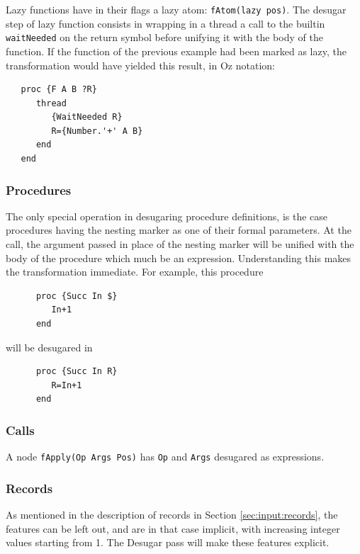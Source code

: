 \documentclass[a4paper]{memoir}
\begin{document}
Lazy functions have in their flags a lazy atom: \lstinline!fAtom(lazy pos)!.
The desugar step of lazy function consists in wrapping in a thread a call to the builtin \lstinline!waitNeeded! on the return symbol before unifying it with the body of the function. If the function of the previous example had been marked as lazy, the transformation would have yielded this result, in Oz notation:
\begin{lstlisting}
   proc {F A B ?R}
      thread 
         {WaitNeeded R}
         R={Number.'+' A B}
      end
   end
\end{lstlisting} 

\subsubsection{Procedures}\label{sec:arch:desugar:procedures}
The only special operation in desugaring procedure definitions, is the case
 procedures having the nesting marker as one of
their formal parameters. At the call, the argument passed in place of the
nesting marker will be unified with the body of the procedure which much be an
expression. 
Understanding this makes the transformation immediate. For example, this procedure
\begin{lstlisting}
      proc {Succ In $}
         In+1
      end
\end{lstlisting}

will be desugared in

\begin{lstlisting}
      proc {Succ In R}
         R=In+1
      end
\end{lstlisting}
\subsubsection{Calls}\label{sec:arch:desugar:calls}
A node \lstinline!fApply(Op Args Pos)! has \lstinline!Op! and \lstinline!Args!
desugared as expressions.
\subsubsection{Records}\label{sec:arch:desugar:records}
As mentioned in the description of records in Section \ref{sec:input:records},
the features can be left out, and are in that case implicit, with increasing
integer values starting from 1. The Desugar pass will make these features explicit.
\end{document}
